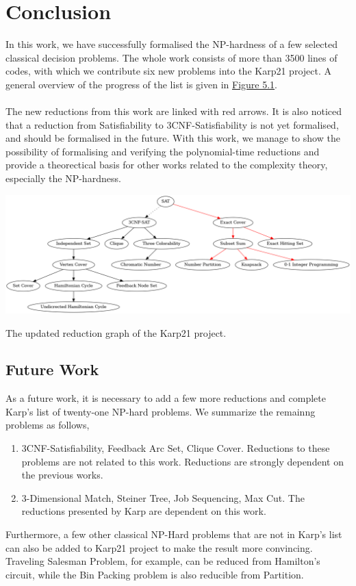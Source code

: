\chapter{Conclusion}\label{chapter:conclusion}
In this work, we have successfully formalised the NP-hardness of 
a few selected classical decision problems.  
The whole work consists of more than 3500 lines of codes, with which we contribute 
six new problems into the Karp21 project. A general overview of the 
progress of the list is given in \hyperref[fig:5.1]{Figure 5.1}.\\\\
The new reductions from this work are linked with red arrows. 
It is also noticed that a reduction from Satisfiability to 3CNF-Satisfiability is not yet
formalised, and should be formalised in the future. With this work,
we manage to show the possibility of formalising and verifying the polynomial-time
reductions and provide a theorectical basis for other works related 
to the complexity theory, especially the NP-hardness. 
\begin{oldfigure}[h!]
\centering 
\includegraphics[angle = 90, scale=0.39]{figures/reductions_new.png}
\caption{The updated reduction graph of the Karp21 project.}
\label{fig:5.1}
\end{oldfigure}

\section*{Future Work}
As a future work, it is necessary to add a few more reductions and complete Karp's 
list of twenty-one NP-hard problems. We summarize the remainng problems as follows,
\begin{enumerate}
    \item 3CNF-Satisfiability, Feedback Arc Set, Clique Cover. Reductions to these problems 
    are not related to this work. Reductions are strongly dependent on the previous works.
    \item 3-Dimensional Match, Steiner Tree, Job Sequencing, Max Cut. The reductions 
    presented by Karp are dependent on this work.
\end{enumerate}
Furthermore, a few other classical NP-Hard problems that are not in Karp's list 
can also be added to Karp21 project to make the result more convincing.
Traveling Salesman Problem, for example, 
can be reduced from Hamilton's circuit, while the Bin Packing problem is also 
reducible from Partition. 
